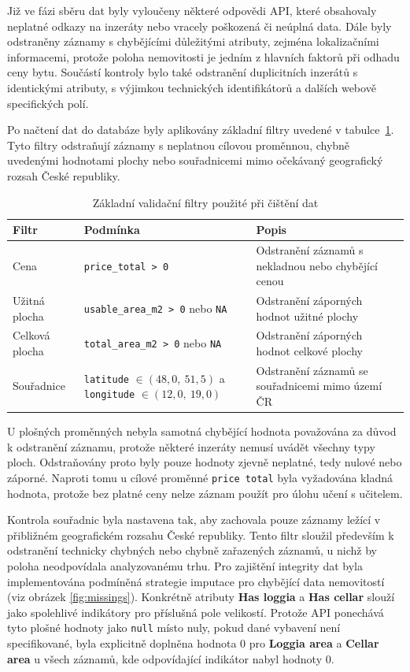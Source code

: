 Již ve fázi sběru dat byly vyloučeny některé odpovědi API, které obsahovaly neplatné odkazy na inzeráty nebo vracely poškozená či neúplná data. Dále byly odstraněny záznamy s chybějícími důležitými atributy, zejména lokalizačními informacemi, protože poloha nemovitosti je jedním z hlavních faktorů při odhadu ceny bytu. Součástí kontroly bylo také odstranění duplicitních inzerátů s identickými atributy, s výjimkou technických identifikátorů a dalších webově specifických polí.

Po načtení dat do databáze byly aplikovány základní filtry uvedené v tabulce~\ref{tab:data_validation_filters}. Tyto filtry odstraňují záznamy s neplatnou cílovou proměnnou, chybně uvedenými hodnotami plochy nebo souřadnicemi mimo očekávaný geografický rozsah České republiky.

\begin{table}[ht]
\centering
\caption{Základní validační filtry použité při čištění dat}
\label{tab:data_validation_filters}
\begin{tabular}{>{\raggedright\arraybackslash}p{2cm}>{\raggedright\arraybackslash}p{5cm}p{5cm}}
\toprule
\textbf{Filtr} & \textbf{Podmínka} & \textbf{Popis} \\
\midrule
Cena & \texttt{price\_total > 0} & Odstranění záznamů s nekladnou nebo chybějící cenou\\
Užitná plocha & \texttt{usable\_area\_m2 > 0} nebo \texttt{NA} & Odstranění záporných hodnot užitné plochy \\
Celková plocha & \texttt{total\_area\_m2 > 0} nebo \texttt{NA} & Odstranění záporných hodnot celkové plochy \\
Souřadnice & \texttt{latitude} $\in (48{,}0,\ 51{,}5)$ a \texttt{longitude} $\in (12{,}0,\ 19{,}0)$ & Odstranění záznamů se souřadnicemi mimo území ČR \\
\bottomrule
\end{tabular}
\end{table}

U plošných proměnných nebyla samotná chybějící hodnota považována za důvod k odstranění záznamu, protože některé inzeráty nemusí uvádět všechny typy ploch. Odstraňovány proto byly pouze hodnoty zjevně neplatné, tedy nulové nebo záporné. Naproti tomu u cílové proměnné \texttt{price total} byla vyžadována kladná hodnota, protože bez platné ceny nelze záznam použít pro úlohu učení s učitelem.

Kontrola souřadnic byla nastavena tak, aby zachovala pouze záznamy ležící v přibližném geografickém rozsahu České republiky. Tento filtr sloužil především k odstranění technicky chybných nebo chybně zařazených záznamů, u nichž by poloha neodpovídala analyzovanému trhu.
Pro zajištění integrity dat byla implementována podmíněná strategie imputace pro chybějící data nemovitostí (viz obrázek \ref{fig:missings}). Konkrétně atributy \textbf{Has loggia} a \textbf{Has cellar} slouží jako spolehlivé indikátory pro příslušná pole velikostí. Protože API ponechává tyto plošné hodnoty jako \texttt{null} místo nuly, pokud dané vybavení není specifikované, byla explicitně doplněna hodnota 0 pro \textbf{Loggia area} a \textbf{Cellar area} u všech záznamů, kde odpovídající indikátor nabyl hodnoty 0.
\newpage
